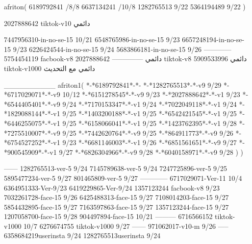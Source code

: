 afriton(
6189792841 /8/8
6637134241 /10/8
1282765513 9/22
5364194489 9/22
)

2027888642 tiktok-v10
دائمي


7447956310-in-no-se-15 10/21
6548765986-in-no-se-15 9/23
6657248194-in-no-se-15 9/23
6226424544-in-no-se-15 9/24
5683866181-in-no-se-15 9/26
------------
5754454119 facbook-v8
دائمي
--------------
2027888642 tiktok-v8
دائمي
5909533996 tiktok-v1000
دائمي مع التحديث

__________
afriton1(
*-*6189792841*-*-
*-*1282765513*-*-v9 9/29
*-*6717029071*-*-v9 10/12
*-*6151278545*-*-v9 9/23
*-*2027888642*-*-v1 9/23
*-*6544405401*-*-v9 9/24
*-*7170153347*-*-v1 9/24
*-*7022049118*-*-v1 9/24
*-*1829088144*-*-v1 9/25
*-*1403200188*-*-v1 9/25
*-*6542421545*-*-v1 9/25
*-*6446255075*-*-v1 9/25
*-*6158066041*-*-v1 9/25
*-*1423762395*-*-v1 9/28
*-*7275510007*-*-v9 9/25
*-*7442620764*-*-v9 9/25
*-*864911773*-*-v9 9/26
*-*6754527252*-*-v1 9/23
*-*6681146003*-*-v1 9/26
*-*6851561651*-*-v9 9/27
*-*900545909*-*-v1 9/27
*-*6826304966*-*-v9 9/28
*-*6040158971*-*-v9 9/28
)
)

------
1282765513-ver-5 9/24
7145789638-ver-5 9/24
7247725896-ver-5 9/25
5895477234-ver-5 9/27
801465809-ver-5 9/27
------------
6717029071-Ver-11
10/4
6364951333-Ver-9/23
6419229865-Ver-9/24
1357123244 facbook-v8 9/23
7032261728-face-15 9/26
6425488313-face-15 9/27
7108014203-face-15 9/27
5854432895-face-15 9/27
7163597863-face-15 9/27
1357123244-face-15 9/27
1207058700-face-15 9/28
904497894-face-15 10/21
---------
6716566152 tiktok-v1000
10/7
6276674755 tiktok-v1000
9/27
------
971062017-v10-m 9/26
-----
6358684219userinsta 9/24
1282765513userinsta 9/24
